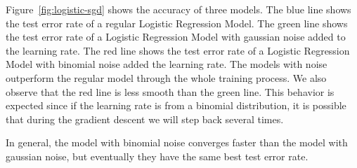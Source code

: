 Figure~\ref{fig:logistic-sgd} shows the accuracy of three models.
The blue line shows the test error rate of a regular Logistic Regression Model.
The green line shows the test error rate of a Logistic Regression Model with
gaussian noise added to the learning rate.  The red line shows the test error
rate of a Logistic Regression Model with binomial noise added the learning rate.
The models with noise outperform the regular model through the whole training
process.  We also observe that the red line is less smooth than the green line.
This behavior is expected since if the learning rate is from a binomial
distribution, it is possible that during the gradient descent we will step back
several times.

In general, the model with binomial noise converges faster than the model
with gaussian noise, but eventually they have the same best test error
rate.

